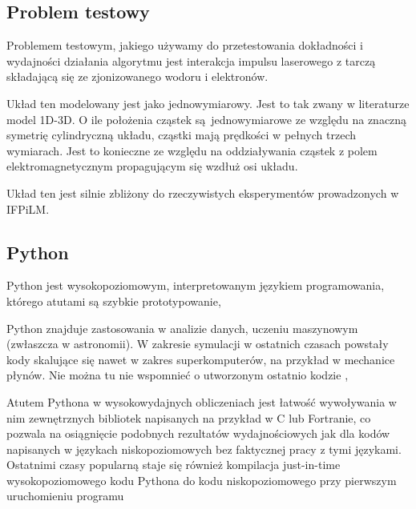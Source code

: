     \subsection{Problem testowy}

    Problemem testowym, jakiego używamy do przetestowania dokładności i wydajności działania algorytmu jest
    interakcja impulsu laserowego z tarczą składającą się ze zjonizowanego wodoru i elektronów.

    Układ ten modelowany jest jako jednowymiarowy. Jest to tak zwany w literaturze model 1D-3D.
    O ile położenia cząstek są jednowymiarowe ze względu na znaczną symetrię
    cylindryczną układu, cząstki mają prędkości w pełnych trzech wymiarach. Jest to konieczne ze względu
    na oddziaływania cząstek z polem elektromagnetycznym propagującym się wzdłuż osi układu.

    Układ ten jest silnie zbliżony do rzeczywistych eksperymentów prowadzonych w IFPiLM.

    \subsection{Python}
    Python jest wysokopoziomowym, interpretowanym językiem programowania, którego atutami są szybkie prototypowanie,

    Python znajduje zastosowania w analizie danych, uczeniu maszynowym (zwłaszcza w astronomii). W zakresie symulacji
    w ostatnich czasach powstały kody skalujące się nawet w zakres superkomputerów, na przykład w mechanice płynów.
    Nie można tu nie wspomnieć o utworzonym ostatnio kodzie ,

    Atutem Pythona w wysokowydajnych obliczeniach jest łatwość wywoływania w nim zewnętrznych bibliotek napisanych
    na przykład w C lub Fortranie, co pozwala na osiągnięcie podobnych rezultatów wydajnościowych jak dla kodów
    napisanych w językach niskopoziomowych bez faktycznej pracy z tymi językami. Ostatnimi czasy popularną staje się
    również kompilacja just-in-time wysokopoziomowego kodu Pythona do kodu niskopoziomowego przy pierwszym
    uruchomieniu programu 
